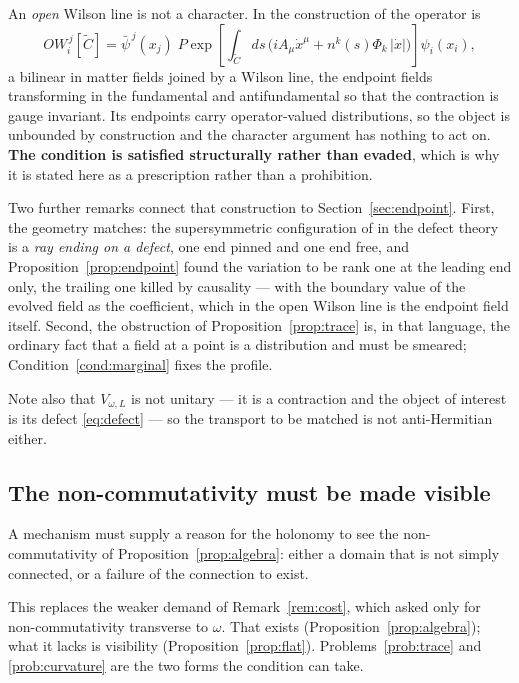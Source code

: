 An \emph{open} Wilson line is not a character. In the construction of
\cite{OWL} the operator is
\[
 OW_i^{\,j}[\tilde C]=\bar\psi^{\,j}(x_j)\;
 P\exp\!\left[\int_{\tilde C}\!ds\,\Big(iA_\mu\dot x^\mu
 +n^k(s)\Phi_k\,|\dot x|\Big)\right]\psi_i(x_i),
\]
a bilinear in matter fields joined by a Wilson line, the endpoint fields
transforming in the fundamental and antifundamental so that the contraction is
gauge invariant. Its endpoints carry operator-valued distributions, so the object
is unbounded by construction and the character argument has nothing to act on.
\textbf{The condition is satisfied structurally rather than evaded}, which is why
it is stated here as a prescription rather than a prohibition.

Two further remarks connect that construction to Section~\ref{sec:endpoint}.
First, the geometry matches: the supersymmetric configuration of \cite{OWL} in
the defect theory is a \emph{ray ending on a defect}, one end pinned and one end
free, and Proposition~\ref{prop:endpoint} found the variation to be rank one at
the leading end only, the trailing one killed by causality --- with the boundary
value of the evolved field as the coefficient, which in the open Wilson line is
the endpoint field itself. Second, the obstruction of Proposition~\ref{prop:trace}
is, in that language, the ordinary fact that a field at a point is a distribution
and must be smeared; Condition~\ref{cond:marginal} fixes the profile.

Note also that $V_{\omega,L}$ is not unitary --- it is a contraction and the
object of interest is its defect \eqref{eq:defect} --- so the transport to be
matched is not anti-Hermitian either.

\subsection{The non-commutativity must be made visible}

\begin{condition}\label{cond:visible}
A mechanism must supply a reason for the holonomy to see the non-commutativity of
Proposition~\ref{prop:algebra}: either a domain that is not simply connected, or a
failure of the connection to exist.
\end{condition}

This replaces the weaker demand of Remark~\ref{rem:cost}, which asked only for
non-commutativity transverse to $\omega$. That exists
(Proposition~\ref{prop:algebra}); what it lacks is visibility
(Proposition~\ref{prop:flat}). Problems~\ref{prob:trace} and \ref{prob:curvature}
are the two forms the condition can take.

